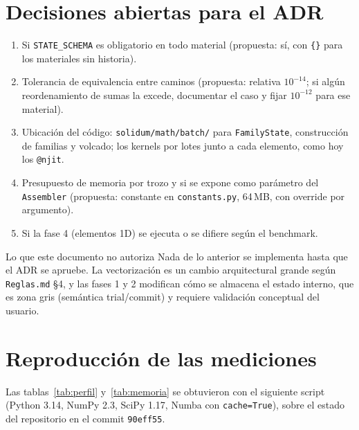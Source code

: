 \documentclass[11pt,letterpaper,oneside]{article}
\newcommand{\code}[1]{\texttt{#1}}
\begin{document}
\section{Decisiones abiertas para el ADR}

\begin{enumerate}[nosep]
  \item Si \code{STATE\_SCHEMA} es obligatorio en todo material (propuesta: sí, con \code{\{\}} para los materiales sin historia).
  \item Tolerancia de equivalencia entre caminos (propuesta: relativa $10^{-14}$; si algún reordenamiento de sumas la excede, documentar el caso y fijar $10^{-12}$ para ese material).
  \item Ubicación del código: \code{solidum/math/batch/} para \code{FamilyState}, construcción de familias y volcado; los kernels por lotes junto a cada elemento, como hoy los \code{@njit}.
  \item Presupuesto de memoria por trozo y si se expone como parámetro del \code{Assembler} (propuesta: constante en \code{constants.py}, 64\,MB, con override por argumento).
  \item Si la fase 4 (elementos 1D) se ejecuta o se difiere según el benchmark.
\end{enumerate}

\begin{warnbox}{Lo que este documento no autoriza}
Nada de lo anterior se implementa hasta que el ADR se apruebe. La vectorización es un cambio arquitectural grande según \code{Reglas.md} §4, y las fases 1 y 2 modifican cómo se almacena el estado interno, que es zona gris (semántica trial/commit) y requiere validación conceptual del usuario.
\end{warnbox}

\appendix
\section{Reproducción de las mediciones}

Las tablas~\ref{tab:perfil} y~\ref{tab:memoria} se obtuvieron con el siguiente script (Python 3.14, NumPy 2.3, SciPy 1.17, Numba con \code{cache=True}), sobre el estado del repositorio en el commit \code{90eff55}.
\end{document}
